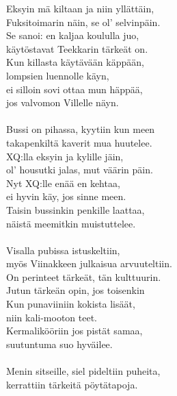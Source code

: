 
            Eksyin mä kiltaan ja niin yllättäin, \\
            Fuksitoimarin näin, se ol' selvinpäin. \\
            Se sanoi: en kaljaa koululla juo, \\
            käytöstavat Teekkarin tärkeät on. \\
            Kun killasta käytävään käppään, \\
            lompsien luennolle käyn, \\
            ei silloin sovi ottaa mun häppää, \\
            jos valvomon Villelle näyn. \\
\hspace{10mm} \\
            Bussi on pihassa, kyytiin kun meen \\
            takapenkiltä kaverit mua huutelee. \\
            XQ:lla eksyin ja kylille jäin, \\
            ol’ housutki jalas, mut väärin päin. \\
            Nyt XQ:lle enää en kehtaa, \\
            ei hyvin käy, jos sinne meen. \\
            Taisin bussinkin penkille laattaa, \\
            näistä meemitkin muistuttelee. \\
\hspace{10mm} \\
            Visalla pubissa istuskeltiin, \\
            myös Viinakkeen julkaisua arvuuteltiin. \\
            On perinteet tärkeät, tän kulttuurin. \\
            Jutun tärkeän opin, jos toisenkin \\
            Kun punaviiniin kokista lisäät, \\
            niin kali-mooton teet. \\
            Kermalikööriin jos pistät samaa, \\
            suutuntuma suo hyväilee. \\
\hspace{10mm} \\
            Menin sitseille, siel pideltiin puheita, \\
            kerrattiin tärkeitä pöytätapoja. \\
